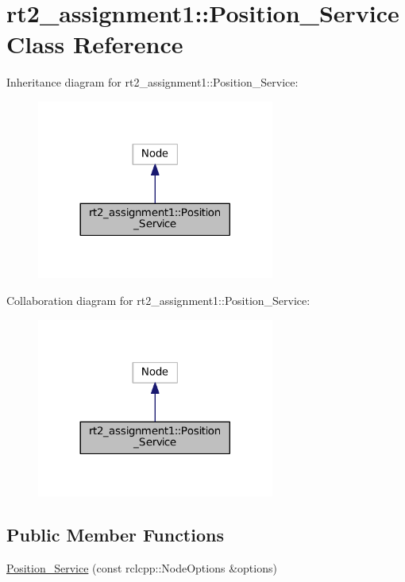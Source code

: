 \hypertarget{classrt2__assignment1_1_1_position___service}{}\section{rt2\+\_\+assignment1\+:\+:Position\+\_\+\+Service Class Reference}
\label{classrt2__assignment1_1_1_position___service}


Inheritance diagram for rt2\+\_\+assignment1\+:\+:Position\+\_\+\+Service\+:
\nopagebreak
\begin{figure}[H]
\begin{center}
\leavevmode
\includegraphics[width=221pt]{classrt2__assignment1_1_1_position___service__inherit__graph}
\end{center}
\end{figure}


Collaboration diagram for rt2\+\_\+assignment1\+:\+:Position\+\_\+\+Service\+:
\nopagebreak
\begin{figure}[H]
\begin{center}
\leavevmode
\includegraphics[width=221pt]{classrt2__assignment1_1_1_position___service__coll__graph}
\end{center}
\end{figure}
\subsection*{Public Member Functions}
\begin{DoxyCompactItemize}
\item 
\hyperlink{classrt2__assignment1_1_1_position___service_ae2e368da61b80e1cae13836801ec907c}{Position\+\_\+\+Service} (const rclcpp\+::\+Node\+Options \&options)
\end{DoxyCompactItemize}


